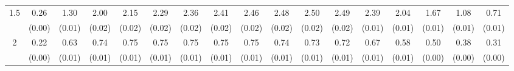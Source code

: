\documentclass[12pt]{article}  %
\theoremstyle{plain}
\begin{document}
\begin{sidewaystable}[htbp]
\begin{tabular}{ccccccccccccccccc}
\multirow{2}{*}{1.5}  &  0.26 &1.30 & 2.00 & 2.15 &  2.29 &  2.36&   2.41  & 2.46  & 2.48  & 2.50 &  2.49 & 2.39& 2.04& 1.67& 1.08& 0.71\\
                      &  (0.00)&   (0.01)& (0.02)& (0.02)& (0.02)& (0.02)& (0.02)& (0.02)& (0.02)&  (0.02)&  (0.02)&  (0.01)&  (0.01)&  (0.01)& (0.01)& (0.01)\\ \hline                                                                                                                                                                                                                                                                                    
\multirow{2}{*}{2}  &0.22 &0.63  &0.74  &0.75  & 0.75 &  0.75  & 0.75 &  0.75  & 0.74 &  0.73  & 0.72 & 0.67& 0.58& 0.50& 0.38& 0.31
\\
                      &  (0.00)& (0.01)& (0.01)& (0.01)& (0.01)& (0.01)& (0.01)& (0.01)& (0.01)&  (0.01)&  (0.01)&  (0.01)&  (0.01)&  (0.00)&  (0.00)  &     (0.00)\\ \hline                                                                                                                                                                                                                                                                                    
\end{tabular}
\end{sidewaystable}
\end{document}
